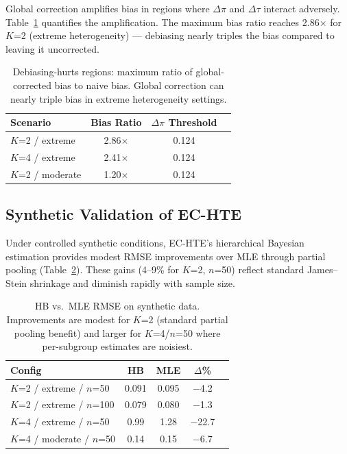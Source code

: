 \documentclass[11pt]{article}
\begin{document}
Global correction amplifies bias in regions where $\Delta\pi$ and $\Delta\tau$ interact adversely.
Table~\ref{tab:debiasing-hurts} quantifies the amplification.
The maximum bias ratio reaches 2.86$\times$ for $K$=2 (extreme heterogeneity) --- debiasing nearly triples the bias compared to leaving it uncorrected.

\begin{table}[t]
\centering
\small
\begin{tabular}{lccc}
\toprule
Scenario & Bias Ratio & $\Delta\pi$ Threshold \\
\midrule
$K$=2 / extreme & 2.86$\times$ & 0.124 \\
$K$=4 / extreme & 2.41$\times$ & 0.124 \\
$K$=2 / moderate & 1.20$\times$ & 0.124 \\
\bottomrule
\end{tabular}
\caption{Debiasing-hurts regions: maximum ratio of global-corrected bias to naive bias. Global correction can nearly triple bias in extreme heterogeneity settings.}
\label{tab:debiasing-hurts}
\end{table}

\subsection{Synthetic Validation of EC-HTE}
\label{sec:synthetic}

Under controlled synthetic conditions, EC-HTE's hierarchical Bayesian estimation provides modest RMSE improvements over MLE through partial pooling (Table~\ref{tab:hb-synthetic}).
These gains (4--9\% for $K$=2, $n$=50) reflect standard James--Stein shrinkage and diminish rapidly with sample size.

\begin{table}[t]
\centering
\small
\begin{tabular}{lcccc}
\toprule
Config & HB & MLE & $\Delta$\% \\
\midrule
$K$=2 / extreme / $n$=50 & 0.091 & 0.095 & $-$4.2 \\
$K$=2 / extreme / $n$=100 & 0.079 & 0.080 & $-$1.3 \\
$K$=4 / extreme / $n$=50 & 0.99 & 1.28 & $-$22.7 \\
$K$=4 / moderate / $n$=50 & 0.14 & 0.15 & $-$6.7 \\
\bottomrule
\end{tabular}
\caption{HB vs.\ MLE RMSE on synthetic data. Improvements are modest for $K$=2 (standard partial pooling benefit) and larger for $K$=4/$n$=50 where per-subgroup estimates are noisiest.}
\label{tab:hb-synthetic}
\end{table}
\end{document}
